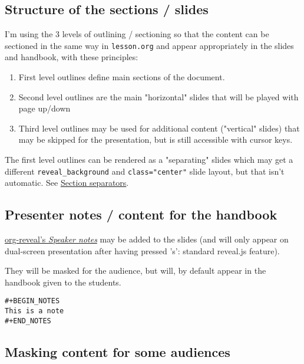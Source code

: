 \documentclass[a4paper]{article}
\begin{document}
\subsection{Structure of the sections / slides}
\label{sec:org8cda526}

I'm using the 3 levels of outlining / sectioning so that the content can be sectioned in the same way in \texttt{lesson.org} and appear appropriately in the slides and handbook, with these principles:

\begin{enumerate}
\item First level outlines define main sections of the document.
\item Second level outlines are the main "horizontal" slides that will be played with page up/down
\item Third level outlines may be used for additional content ("vertical" slides) that may be skipped for the presentation, but is still accessible with cursor keys.
\end{enumerate}

\begin{NOTES}
The first level outlines can be rendered as a "separating" slides which may get a different \texttt{reveal\_background} and \texttt{class="center"} slide layout, but that isn't automatic. See \hyperref[sec:orgff9c296]{Section separators}.
\end{NOTES}

\subsection{Presenter notes / content for the handbook}
\label{sec:org0f7fb15}

\href{https://github.com/yjwen/org-reveal/#speaker-notes}{org-reveal's \emph{Speaker notes}} may be added to the slides (and will only appear on dual-screen presentation after having pressed 's': standard reveal.js feature).

They will be masked for the audience, but will, by default appear in the handbook given to the students.

\begin{verbatim}
#+BEGIN_NOTES
This is a note
#+END_NOTES
\end{verbatim}

\subsection{Masking content for some audiences}
\label{sec:orge883b3d}
\end{document}
